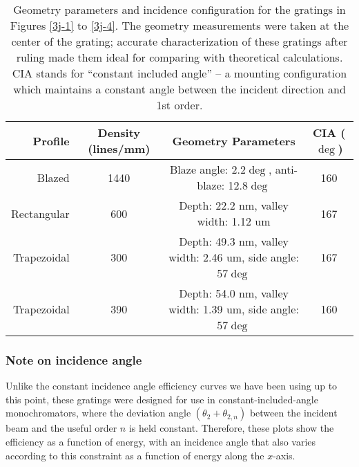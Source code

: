 \begin{table}[htbp]
   \centering
   \caption[Geometry parameters and incidence configuration for the gratings in Figures \ref{3j-1} to \ref{3j-4}.]{Geometry parameters and incidence configuration for the gratings in Figures \ref{3j-1} to \ref{3j-4}.  The geometry measurements were taken at the center of the grating; accurate characterization of these gratings after ruling made them ideal for comparing with theoretical calculations. CIA stands for ``constant included angle'' -- a mounting configuration which maintains a constant angle between the incident direction and 1st order.}
   \begin{tabular}{@{} |r c c c| @{}} %
      \hline
        Profile    &  Density (lines/mm)& Geometry Parameters & CIA ($\deg$)\\
      \hline \hline
Blazed & 1440 & Blaze angle: 2.2$\deg$, anti-blaze: 12.8$\deg$ & 160 \\
Rectangular & 600 & Depth: 22.2 nm, valley width: 1.12 um & 167 \\
Trapezoidal & 300 & Depth: 49.3 nm, valley width: 2.46 um, side angle: 57$\deg$ & 167\\
Trapezoidal & 390 & Depth: 54.0 nm, valley width: 1.39 um, side angle: 57$\deg$ & 160\\
\hline
   \end{tabular}
   \label{3j-table}
\end{table}

\subsubsection{Note on incidence angle}
Unlike the constant incidence angle efficiency curves we have been using up to this point, these gratings were designed for use in constant-included-angle monochromators, where the deviation angle $(\theta_2 + \theta_{2,n})$ between the incident beam and the useful order $n$ is held constant.  Therefore, these plots show the efficiency as a function of energy, with an incidence angle that also varies according to this constraint as a function of energy along the $x$-axis.

